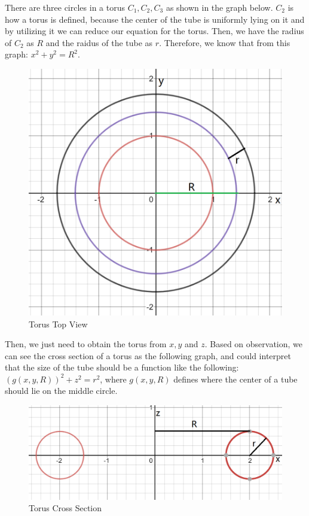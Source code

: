 \documentclass[a4paper,12pt]{report}
\begin{document}
There are three circles in a torus $C_1, C_2, C_3$ as shown in the graph below. $C_2$ is how a torus is defined, because the center of the tube is uniformly lying on it and by utilizing it we can reduce our equation for the torus.  Then, we have the radius of $C_2$ as $R$ and the raidus of the tube as $r$. Therefore, we know that from this graph:
\(x^2+y^2=R^2\).
\begin{figure}[h]
\centering
\includegraphics[scale=0.4]{./Pic/Torus2.png}
\caption{Torus Top View}
\end{figure}

Then, we just need to obtain the torus from $x,y$ and $z$. Based on observation, we can see the cross section of a torus as the following graph, and could interpret that the size of the tube should be a function like the following: $(g(x,y, R))^2+z^2=r^2$, where $g(x,y,R)$ defines where the center of a tube should lie on the middle circle.
\begin{figure}[h]
\centering
\includegraphics[scale=0.75]{./Pic/Torus3.png}
\caption{Torus Cross Section}
\end{figure}
\end{document}
